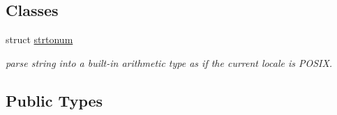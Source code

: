 \subsection*{Classes}
\begin{DoxyCompactItemize}
\item 
struct \hyperlink{structnlohmann_1_1basic__json_1_1lexer_1_1strtonum}{strtonum}
\begin{DoxyCompactList}\small\item\em parse string into a built-\/in arithmetic type as if the current locale is P\+O\+S\+IX. \end{DoxyCompactList}\end{DoxyCompactItemize}
\subsection*{Public Types}
